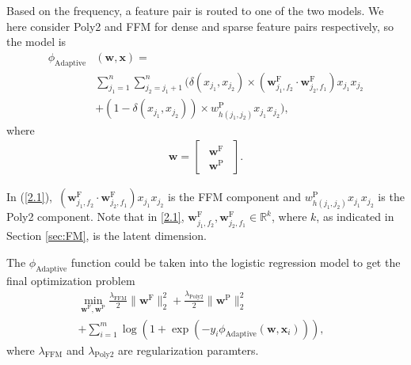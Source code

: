 Based on the frequency, a feature pair is routed to one of the two models. We here consider Poly2 and FFM for dense and sparse feature pairs respectively, so the model is
\begin{equation}
\label{2.1}
\begin{split}
\phi_{\text{Adaptive}}&(\boldsymbol{w},\boldsymbol{x})= \\
&\sum_{j_1=1}^n\sum_{j_2=j_1+1}^n \biggl(\delta(x_{j_1},x_{j_2})\times(\boldsymbol{w}_{j_1,f_2}^\text{F}\cdot\boldsymbol{w}_{j_2,f_1}^\text{F})x_{j_1}x_{j_2} \\
&+(1-\delta(x_{j_1},x_{j_2}))\times w_{h(j_1,j_2)}^\text{P}x_{j_1}x_{j_2}\biggr), 
\end{split}
\end{equation}
where \\
\begin{align*}
\boldsymbol{w}=%
\begin{bmatrix}
\begin{array}{c}
\boldsymbol{w}^\text{F}\\
\boldsymbol{w}^\text{P}
\end{array}
\end{bmatrix}.
\end{align*}

In (\ref{2.1}),\ $(\boldsymbol{w}_{j_1,f_2}^\text{F}\cdot\boldsymbol{w}_{j_2,f_1}^\text{F})x_{j_1}x_{j_2}$ is the FFM component and $w_{h(j_1,j_2)}^\text{P}x_{j_1}x_{j_2}$ is the Poly2 component. Note that in \eqref{2.1}, $\boldsymbol{w}^\text{F}_{j_1, f_2}, \boldsymbol{w}^\text{F}_{j_2, f_1} \in \mathbb{R}^k$, where $k$, as indicated in Section \ref{sec:FM}, is the latent dimension.

The $\phi_{\text{Adaptive}}$ function could be taken into the logistic regression model to get the final optimization problem
\begin{equation}\label{2.2}
\begin{split}
\min_{\boldsymbol{w}^{\text{F}},\boldsymbol{w}^{\text{P}}}\frac{\lambda_{\text{FFM}}}{2}\|\boldsymbol{w}^{\text{F}}\|_2^2 + \frac{\lambda_\text{Poly2}}{2}\|\boldsymbol{w}^\text{P}\|_2^2 &\\
+\sum_{i=1}^{m}\log(1+\exp(-y_i\phi_{\text{Adaptive}}(\boldsymbol{w},\boldsymbol{x}_i))),
\end{split}
\end{equation}
where $\lambda_{\text{FFM}}$ and $\lambda_{\text{Poly2}}$ are regularization paramters.


